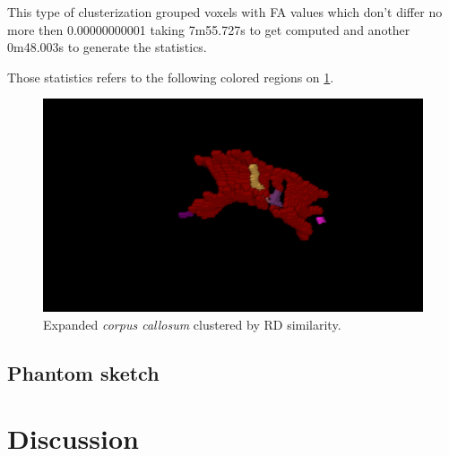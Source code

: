 \documentclass[a4paper,11pt]{report}
\begin{document}
    This type of clusterization grouped voxels with FA values which don't differ no more then 0.00000000001 taking 7m55.727s to get computed and another 0m48.003s to generate the statistics.

    Those statistics refers to the following colored regions on \ref{fig:tv-regions}.

    \begin{figure}[!ht]
      \includegraphics[width=1\linewidth]{img/regions/tv_regions.png}
      \caption{Expanded \textit{corpus callosum} clustered by RD similarity.}
      \label{fig:tv-regions}
    \end{figure}

\section{Phantom sketch}

\chapter{Discussion}
\end{document}
